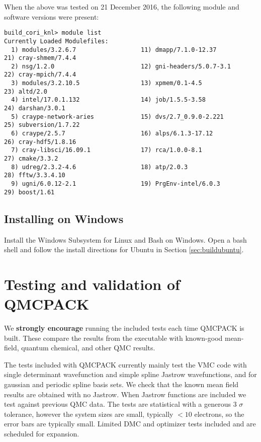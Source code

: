 When the above was tested on 21 December 2016, the following module and
software versions were present:

\begin{verbatim}
build_cori_knl> module list
Currently Loaded Modulefiles:
  1) modules/3.2.6.7                  11) dmapp/7.1.0-12.37                21) cray-shmem/7.4.4
  2) nsg/1.2.0                        12) gni-headers/5.0.7-3.1            22) cray-mpich/7.4.4
  3) modules/3.2.10.5                 13) xpmem/0.1-4.5                    23) altd/2.0
  4) intel/17.0.1.132                 14) job/1.5.5-3.58                   24) darshan/3.0.1
  5) craype-network-aries             15) dvs/2.7_0.9.0-2.221              25) subversion/1.7.22
  6) craype/2.5.7                     16) alps/6.1.3-17.12                 26) cray-hdf5/1.8.16
  7) cray-libsci/16.09.1              17) rca/1.0.0-8.1                    27) cmake/3.3.2
  8) udreg/2.3.2-4.6                  18) atp/2.0.3                        28) fftw/3.3.4.10
  9) ugni/6.0.12-2.1                  19) PrgEnv-intel/6.0.3               29) boost/1.61
\end{verbatim}

\subsection{Installing on Windows}
Install the Windows Subsystem for Linux and Bash on Windows.
Open a bash shell and follow the install directions for Ubuntu in Section \ref{sec:buildubuntu}.

\section{Testing and validation of QMCPACK}
\label{sec:testing}
We \textbf{strongly encourage} running the included tests each time
QMCPACK is built. These compare the results from the executable with
known-good mean-field, quantum chemical, and other QMC results. 

The tests included with QMCPACK currently mainly test the VMC code with
single determinant wavefunction and simple spline Jastrow
wavefunctions, and for gaussian and periodic spline basis
sets. We check that the known mean
field results are obtained with no Jastrow. When Jastrow functions are
included we test against previous QMC data. The tests are statistical
with a generous 3 $\sigma$ tolerance, however the system sizes are
small, typically $<10$ electrons, so the error bars are typically
small. Limited DMC and optimizer tests included and are scheduled for expansion.

